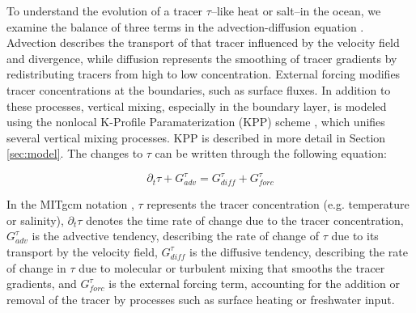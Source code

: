 \documentclass[draft]{agujournal2019}
\begin{document}
To understand the evolution of a tracer $\tau$--like heat or salt--in the ocean, we examine the balance of three terms in the advection-diffusion equation \cite{Campin2004}. Advection describes the transport of that tracer influenced by the velocity field and divergence, while diffusion represents the smoothing of tracer gradients by redistributing tracers from high to low concentration. External forcing modifies tracer concentrations at the boundaries, such as surface fluxes. In addition to these processes, vertical mixing, especially in the boundary layer, is modeled using the nonlocal K-Profile Paramaterization (KPP) scheme \cite{Large1994}, which unifies several vertical mixing processes. KPP is described in more detail in Section \ref{sec:model}. The changes to $\tau$ can be written through the following equation:

\begin{equation}
\partial_t\tau + G^\tau_{adv} = G^\tau_{diff} + G^\tau_{forc} \label{eq:mitgcmcons}
\end{equation}

In the MITgcm notation \cite{Campin2004,mitgcm_manual}, $\tau$ represents the tracer concentration (e.g. temperature or salinity), $\partial_t \tau$ denotes the time rate of change due to the tracer concentration, $G^{\tau}_{adv}$ is the advective tendency, describing the rate of change of $\tau$ due to its transport by the velocity field, $G^{\tau}_{diff}$ is the diffusive tendency, describing the rate of change in $\tau$ due to molecular or turbulent mixing that smooths the tracer gradients, and $G^{\tau}_{forc}$ is the external forcing term, accounting for the addition or removal of the tracer by processes such as surface heating or freshwater input. 
\end{document}
